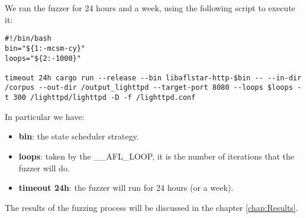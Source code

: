 We ran the fuzzer for 24 hours and a week, using the following script to execute it:

\begin{lstlisting}
#!/bin/bash
bin="${1:-mcsm-cy}"
loops="${2:-1000}"

timeout 24h cargo run --release --bin libaflstar-http-$bin -- --in-dir /corpus --out-dir /output_lighttpd --target-port 8080 --loops $loops -t 300 /lighttpd/lighttpd -D -f /lighttpd.conf
\end{lstlisting}
In particular we have:
\begin{itemize}
    \item \textbf{bin}: the state scheduler strategy.
    \item \textbf{loops}: taken by the \_\_AFL\_LOOP, it is the number of iterations that the fuzzer will do.
    \item \textbf{timeout 24h}: the fuzzer will run for 24 hours (or a week).
\end{itemize}
The results of the fuzzing process will be discussed in the chapter \ref{chap:Results}.